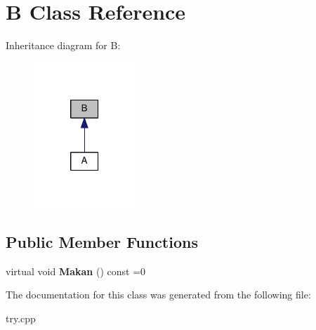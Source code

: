 \hypertarget{classB}{}\section{B Class Reference}
\label{classB}


Inheritance diagram for B\+:
\nopagebreak
\begin{figure}[H]
\begin{center}
\leavevmode
\includegraphics[width=109pt]{classB__inherit__graph}
\end{center}
\end{figure}
\subsection*{Public Member Functions}
\begin{DoxyCompactItemize}
\item 
\mbox{\label{classB_aeab7ab5980cd8c4af5d082b67ed16215}} 
virtual void {\bfseries Makan} () const =0
\end{DoxyCompactItemize}


The documentation for this class was generated from the following file\+:\begin{DoxyCompactItemize}
\item 
try.\+cpp\end{DoxyCompactItemize}
